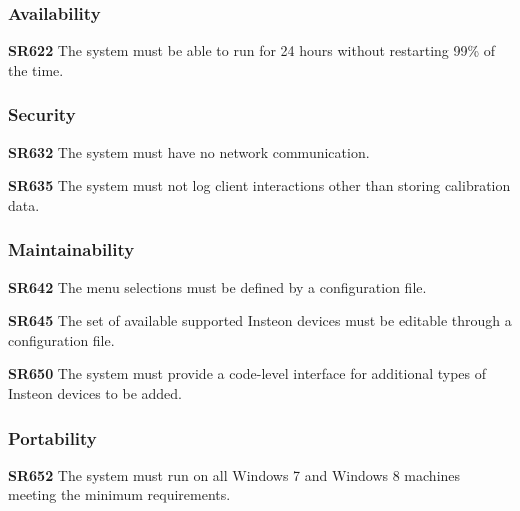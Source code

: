 \documentclass{article}
\begin{document}
\subsubsection{Availability}

\textbf{SR622} The system must be able to run for 24 hours without restarting
99\% of the time.

\subsubsection{Security}

\textbf{SR632} The system must have no network communication.

\textbf{SR635} The system must not log client interactions other than storing
calibration data.

\subsubsection{Maintainability}

\textbf{SR642} The menu selections must be defined by a configuration file.

\textbf{SR645} The set of available supported Insteon devices must be editable
through a configuration file.

\textbf{SR650} The system must provide a code-level interface for additional
types of Insteon devices to be added.

\subsubsection{Portability}

\textbf{SR652} The system must run on all Windows 7 and Windows 8 machines
meeting the minimum requirements.


\newpage
\end{document}
